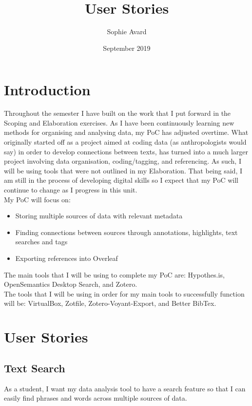 \documentclass{article}
\title{User Stories}
\author{Sophie Avard}
\date{September 2019}
\begin{document}
\maketitle

\tableofcontents

\section{Introduction}
Throughout the semester I have built on the work that I put forward in the Scoping and Elaboration exercises. As I have been continuously learning new methods for organising and analysing data, my PoC has adjusted overtime. What originally started off as a project aimed at coding data (as anthropologists would say) in order to develop connections between texts, has turned into a much larger project involving data organisation, coding/tagging, and referencing. As such, I will be using tools that were not outlined in my Elaboration. That being said, I am still in the process of developing digital skills so I expect that my PoC will continue to change as I progress in this unit.\\
My PoC will focus on:
\begin{itemize}
    \item Storing multiple sources of data with relevant metadata
    \item Finding connections between sources through annotations, highlights, text searches and tags
    \item Exporting references into Overleaf 
\end{itemize}
The main tools that I will be using to complete my PoC are: Hypothes.is, OpenSemantics Desktop Search, and Zotero.\\ The tools that I will be using in order for my main tools to successfully function will be: VirtualBox, Zotfile, Zotero-Voyant-Export, and Better BibTex.

\section{User Stories}

\subsection{Text Search}
As a student, I want my data analysis tool to have a search feature so that I can easily find phrases and words across multiple sources of data.\\
\end{document}
